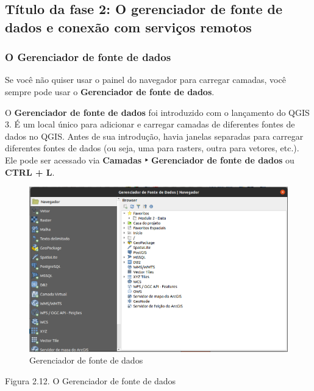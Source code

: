 \documentclass[
]{book}
\begin{document}
\hypertarget{tuxedtulo-da-fase-2-o-gerenciador-de-fonte-de-dados-e-conexuxe3o-com-serviuxe7os-remotos}{%
\subsection{Título da fase 2: O gerenciador de fonte de dados e conexão com serviços remotos}\label{tuxedtulo-da-fase-2-o-gerenciador-de-fonte-de-dados-e-conexuxe3o-com-serviuxe7os-remotos}}

\hypertarget{o-gerenciador-de-fonte-de-dados}{%
\subsubsection{\texorpdfstring{\textbf{O Gerenciador de fonte de dados}}{O Gerenciador de fonte de dados}}\label{o-gerenciador-de-fonte-de-dados}}

Se você não quiser usar o painel do navegador para carregar camadas, você sempre pode usar o \textbf{Gerenciador de fonte de dados}.

O \textbf{Gerenciador de fonte de dados} foi introduzido com o lançamento do QGIS 3. É um local único para adicionar e carregar camadas de diferentes fontes de dados no QGIS. Antes de sua introdução, havia janelas separadas para carregar diferentes fontes de dados (ou seja, uma para rasters, outra para vetores, etc.). Ele pode ser acessado via \textbf{Camadas ‣ Gerenciador de fonte de dados} ou \textbf{CTRL + L}.

\begin{figure}
\centering
\includegraphics{media/modulo2/data-source-manager-1.png}
\caption{Gerenciador de fonte de dados}
\end{figure}

Figura 2.12. O Gerenciador de fonte de dados
\end{document}
